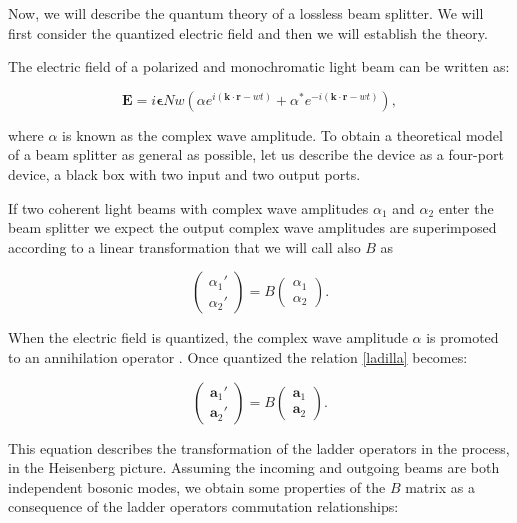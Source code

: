 \documentclass[12pt]{book}
\begin{document}
Now, we will describe the quantum theory of a lossless beam splitter. We will first consider the quantized electric field and then we will establish the theory. 


The electric field of a polarized and monochromatic light beam can be written as:

\begin{equation}
\mathbf{E}=i \mathbf{\epsilon}N w \left( \alpha e^{i (\mathbf{k \cdot r}-w t)}+\alpha^{*} e^{-i (\mathbf{k \cdot r}-w t)} \right),
\end{equation}

where $\alpha$ is known as the complex wave amplitude. To obtain a theoretical model of a beam splitter as general as possible, let us describe the device as a four-port device, a black box with two input and two output ports.

If two coherent light beams with complex wave amplitudes $\alpha_{1}$ and $\alpha_{2}$ enter the beam splitter we expect the output complex wave amplitudes  are superimposed according to a linear transformation that we will call also $B$ as

\begin{equation}
\begin{pmatrix} \alpha_{1}' \\ \alpha_{2}' \end{pmatrix}=B\begin{pmatrix} \alpha_{1} \\ \alpha_{2} \end{pmatrix}. \label{ladilla}
\end{equation}

When the electric field  is quantized, the complex wave amplitude $\alpha$ is promoted to an annihilation operator \cite{ludon}. Once quantized the relation \ref{ladilla} becomes:

\begin{equation}
\begin{pmatrix} \mathbf{a}_{1}' \\ \mathbf{a}_{2}' \end{pmatrix}=B\begin{pmatrix} \mathbf{a}_{1} \\ \mathbf{a}_{2} \end{pmatrix}.
\label{eq:amplitudes}
\end{equation}

This equation describes the transformation of the ladder operators in the process, in the Heisenberg picture. Assuming the incoming and outgoing beams are both independent bosonic modes, we obtain some properties of the $B$ matrix as a consequence of the ladder operators commutation relationships:
\end{document}
